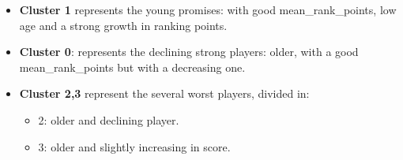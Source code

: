 \documentclass{article}
\begin{document}
\begin{itemize}
    \item{ \textbf{Cluster 1} represents the young promises: with good mean\_rank\_points, low age and a strong growth in ranking points.}
    \item{ \textbf{Cluster 0}: represents the declining strong players: older, with a good mean\_rank\_points but with a decreasing one.}
    \item{ \textbf{Cluster 2,3} represent the several worst players, divided in:}
    \begin{itemize}
        \item{2: older and declining player.}
        \item{3: older and slightly increasing in score.}
    \end{itemize}
\end{itemize}

	
\end{document}
